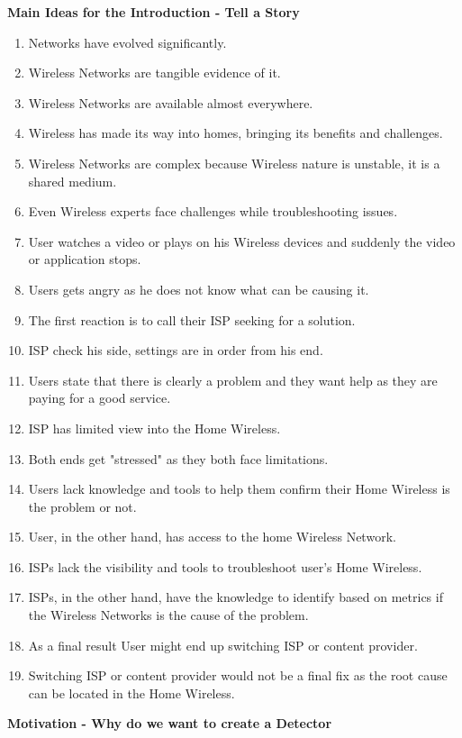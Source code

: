 \textbf{Main Ideas for the Introduction - Tell a Story}
\begin{enumerate}
	
	\item Networks have evolved significantly.
	\item Wireless Networks are tangible evidence of it.
	\item Wireless Networks are available almost everywhere.
	\item Wireless has made its way into homes, bringing its benefits and challenges.
	\item Wireless Networks are complex because Wireless nature is unstable, it is a shared medium.
	\item Even Wireless experts face challenges while troubleshooting issues.
	\item User watches a video or plays on his Wireless devices and suddenly the video or application stops.
	\item Users gets angry as he does not know what can be causing it.
	\item The first reaction is to call their ISP seeking for a solution.
	\item ISP check his side, settings are in order from his end.
	\item Users state that there is clearly a problem and they want help as they are paying for a good service.
	\item ISP has limited view into the Home Wireless.
	\item Both ends get "stressed" as they both face limitations.
	\item Users lack knowledge and tools to help them confirm their Home Wireless is the problem or not.
	\item User, in the other hand, has access to the home Wireless Network.
	\item ISPs lack the visibility and tools to troubleshoot user's Home Wireless.
	\item ISPs, in the other hand, have the knowledge to identify based on metrics if the Wireless Networks is the cause of the problem.
	\item As a final result User might end up switching ISP or content provider.
	\item Switching ISP or content provider would not be a final fix as the root cause can be located in the Home Wireless. \cite{hostview}
\end{enumerate}

\textbf{Motivation - Why do we want to create a Detector}

